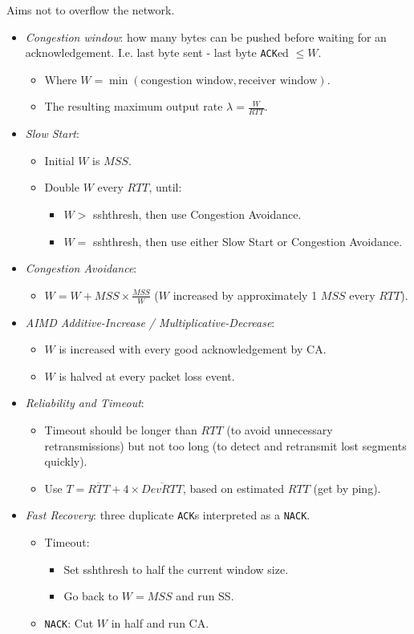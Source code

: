 \documentclass[twocolumn,english]{article}
\begin{document}
Aims not to overflow the network.
\begin{itemize}
\item \emph{Congestion window}: how many bytes can be pushed before waiting
for an acknowledgement. I.e. last byte sent - last byte \texttt{ACK}ed
$\leq W$.
\begin{itemize}
\item Where $W=\min\left(\text{congestion window},\text{receiver window}\right)$.
\item The resulting maximum output rate $\lambda=\frac{W}{RTT}$.
\end{itemize}
\item \emph{Slow Start}:
\begin{itemize}
\item Initial $W$ is $MSS$.
\item Double $W$ every $RTT$, until:
\begin{itemize}
\item $W>$ sshthresh, then use Congestion Avoidance.
\item $W=$ sshthresh, then use either Slow Start or Congestion Avoidance.
\end{itemize}
\end{itemize}
\item \emph{Congestion Avoidance}:
\begin{itemize}
\item $W=W+MSS\times\frac{MSS}{W}$ ($W$ increased by approximately 1 $MSS$
every $RTT$).
\end{itemize}
\item \emph{AIMD Additive-Increase / Multiplicative-Decrease}:
\begin{itemize}
\item $W$ is increased with every good acknowledgement by CA.
\item $W$ is halved at every packet loss event.
\end{itemize}
\item \emph{Reliability and Timeout}:
\begin{itemize}
\item Timeout should be longer than $RTT$ (to avoid unnecessary retransmissions)
but not too long (to detect and retransmit lost segments quickly).
\item Use $T=\overline{RTT}+4\times\overline{DevRTT}$, based on estimated
$RTT$ (get by ping).
\end{itemize}
\item \emph{Fast Recovery}: three duplicate \texttt{ACK}s interpreted as
a \texttt{NACK}.
\begin{itemize}
\item Timeout:
\begin{itemize}
\item Set sshthresh to half the current window size.
\item Go back to $W=MSS$ and run SS.
\end{itemize}
\item \texttt{NACK}: Cut $W$ in half and run CA.
\end{itemize}
\end{itemize}
\end{document}
